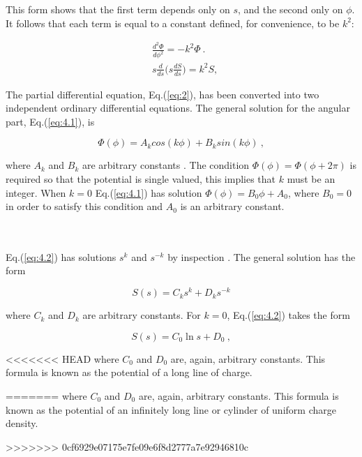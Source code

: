 \documentclass[a4paper]{jpconf}
\begin{document}
\noindent This form shows that the first term depends only on $s$, and the second only on $\phi$. It follows that  each term is equal to a constant defined, for convenience, to be $k^2$:

\begin{subequations}
\begin{align}
&\frac{d^2 \Phi}{d \phi^2} = - k^2 \Phi ~. \label{eq:4.1}\\
&s\frac{d}{ds}\bigg(s \frac{dS}{ds}\bigg) = k^2 S, \label{eq:4.2}
\end{align}
\label{eq:4}
\end{subequations} 

\noindent The partial differential equation, Eq.(\ref{eq:2}), has been converted into two independent ordinary differential equations. The general solution for the angular part, Eq.(\ref{eq:4.1}), is

\begin{equation}
\Phi(\phi) = A_k cos(k \phi) + B_k sin(k \phi)~,
\label{eq:phi}
\end{equation}

\noindent where $A_k$ and $B_k$ are arbitrary constants \cite{RHB-MathematicalMethods}. The condition $\Phi(\phi) = \Phi(\phi + 2 \pi)$ is required so that the potential is single valued, this implies that $k$ must be an integer. %
When $k = 0$ Eq.(\ref{eq:4.1}) has solution $\Phi(\phi) = B_0 \phi + A_0$, where $B_0 = 0$ in order to satisfy this condition and $A_0$ is an arbitrary constant. \\ \\ \\ \par 
Eq.(\ref{eq:4.2}) has solutions $s^k$ and $s^{-k}$ by inspection \cite{griffiths-introElec}. The general solution has the form

\begin{equation}
S(s) = C_k s^k + D_k s^{-k}
\label{eq:s}
\end{equation} 

\noindent where $C_k$ and $D_k$ are arbitrary constants. For $k = 0$, Eq.(\ref{eq:4.2}) takes the form

\begin{equation}
S(s) = C_0 \ln{s} + D_0~,
\label{eq:s2}
\end{equation}

<<<<<<< HEAD
\noindent where $C_0$ and $D_0$ are, again, arbitrary constants. This formula is known as the potential of a long line of charge. \par
=======
\noindent where $C_0$ and $D_0$ are, again, arbitrary constants. This formula is known as the potential of an infinitely long line or cylinder of uniform charge density. \par
>>>>>>> 0cf6929e07175e7fe09e6f8d2777a7e92946810c
\end{document}
